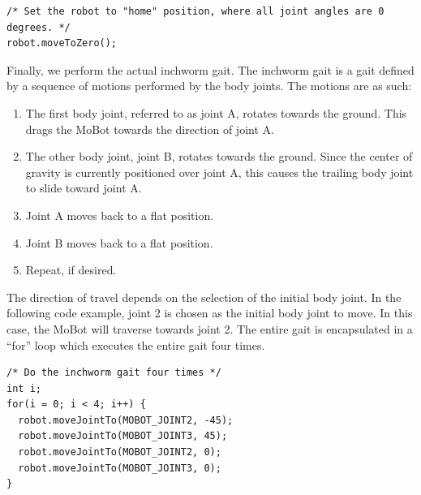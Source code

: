 \documentclass{article}
\begin{document}
\begin{verbatim}
/* Set the robot to "home" position, where all joint angles are 0 degrees. */
robot.moveToZero();
\end{verbatim}

Finally, we perform the actual inchworm gait. The inchworm gait is a gait defined
by a sequence of motions performed by the body joints. The motions are as such:
\begin{enumerate}
\item The first body joint, referred to as joint A, rotates towards the ground.
This drags the MoBot towards the direction of joint A.
\item The other body joint, joint B, rotates towards the ground. Since the center
of gravity is currently positioned over joint A, this causes the trailing body 
joint to slide toward joint A.
\item Joint A moves back to a flat position.
\item Joint B moves back to a flat position.
\item Repeat, if desired.
\end{enumerate}
The direction of travel depends on the selection of the initial body joint. In
the following code example, joint 2 is chosen as the initial body joint to move.
In this case, the MoBot will traverse towards joint 2. The entire gait is
encapsulated in a ``for'' loop which executes the entire gait four times.
\begin{verbatim}
/* Do the inchworm gait four times */
int i;
for(i = 0; i < 4; i++) {
  robot.moveJointTo(MOBOT_JOINT2, -45);
  robot.moveJointTo(MOBOT_JOINT3, 45);
  robot.moveJointTo(MOBOT_JOINT2, 0);
  robot.moveJointTo(MOBOT_JOINT3, 0);
}
\end{verbatim}
\end{document}
